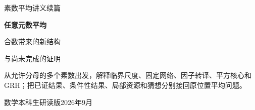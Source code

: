 \documentclass[11pt,a4paper,oneside,openany]{book}
\theoremstyle{definition}\newtheorem{example}[theorem]{例}\newtheorem{conjecture}[theorem]{猜想}
\numberwithin{equation}{chapter}\setcounter{tocdepth}{1}
\begin{document}
\frontmatter
\begin{titlepage}\centering\vspace*{26mm}
{\Large 素数平均讲义续篇\par}\vspace{16mm}
{\Huge\bfseries 任意元数平均\par}\vspace{8mm}
{\LARGE 合数带来的新结构\par}\vspace{5mm}
{\Large 与尚未完成的证明\par}\vfill
\begin{minipage}{.8\textwidth}
从允许分母的多个素数出发，解释临界尺度、固定网络、因子转译、平方核心和GRH；把已证结果、条件性结果、局部资源和猜想分别接回原位置平均问题。
\end{minipage}\vfill
{\large 数学本科生研读版\quad 2026年9月\par}
\end{titlepage}
\end{document}
